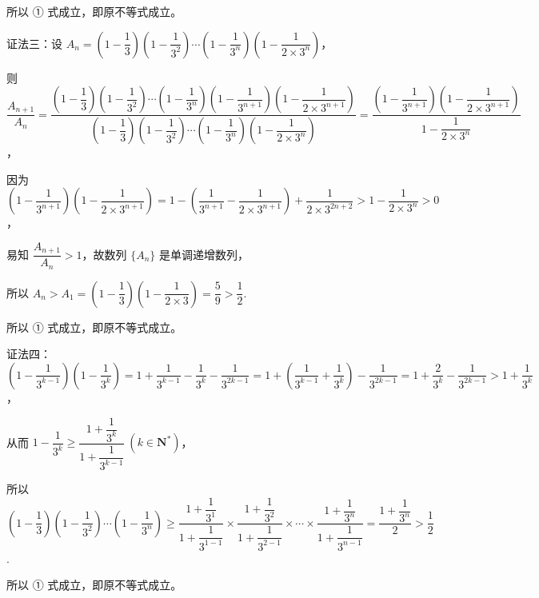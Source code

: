 \begin{solutions}
所以 ① 式成立，即原不等式成立。

证法三：设 $A_n=(1-\dfrac{1}{3})(1-\dfrac{1}{3^2})\cdots(1-\dfrac{1}{3^n})(1-\dfrac{1}{2\times 3^n})$，

则 $\dfrac{A_{n+1}}{A_n} = \dfrac{(1-\dfrac{1}{3})(1-\dfrac{1}{3^2})\cdots(1-\dfrac{1}{3^n})(1-\dfrac{1}{3^{n+1}})(1-\dfrac{1}{2\times 3^{n+1}})}{(1-\dfrac{1}{3})(1-\dfrac{1}{3^2})\cdots(1-\dfrac{1}{3^n})(1-\dfrac{1}{2\times 3^n})} = \dfrac{(1-\dfrac{1}{3^{n+1}})(1-\dfrac{1}{2\times 3^{n+1}})}{1-\dfrac{1}{2\times 3^n}}$，

因为 $(1-\dfrac{1}{3^{n+1}})(1-\dfrac{1}{2\times 3^{n+1}}) = 1-(\dfrac{1}{3^{n+1}}-\dfrac{1}{2\times 3^{n+1}}) + \dfrac{1}{2\times 3^{2n+2}} > 1-\dfrac{1}{2\times 3^n} > 0$，

易知 $\dfrac{A_{n+1}}{A_n} > 1$，故数列 $\{A_n\}$ 是单调递增数列，

所以 $A_n > A_1 = (1-\dfrac{1}{3})(1-\dfrac{1}{2\times 3}) = \dfrac{5}{9} > \dfrac{1}{2}$.

所以 ① 式成立，即原不等式成立。

证法四：$(1-\dfrac{1}{3^{k-1}})(1-\dfrac{1}{3^k}) = 1+\dfrac{1}{3^{k-1}}-\dfrac{1}{3^k}-\dfrac{1}{3^{2k-1}} = 1+(\dfrac{1}{3^{k-1}}+\dfrac{1}{3^k})-\dfrac{1}{3^{2k-1}} = 1+\dfrac{2}{3^k}-\dfrac{1}{3^{2k-1}} > 1+\dfrac{1}{3^k}$，

从而 $1-\dfrac{1}{3^k} \ge \dfrac{1+\dfrac{1}{3^k}}{1+\dfrac{1}{3^{k-1}}}\ (k\in \mathbf{N}^*)$，

所以 $(1-\dfrac{1}{3})(1-\dfrac{1}{3^2})\cdots(1-\dfrac{1}{3^n}) \ge \dfrac{1+\dfrac{1}{3^1}}{1+\dfrac{1}{3^{1-1}}} \times \dfrac{1+\dfrac{1}{3^2}}{1+\dfrac{1}{3^{2-1}}} \times \cdots \times \dfrac{1+\dfrac{1}{3^n}}{1+\dfrac{1}{3^{n-1}}} = \dfrac{1+\dfrac{1}{3^n}}{2} > \dfrac{1}{2}$.

所以 ① 式成立，即原不等式成立。
\end{solutions}